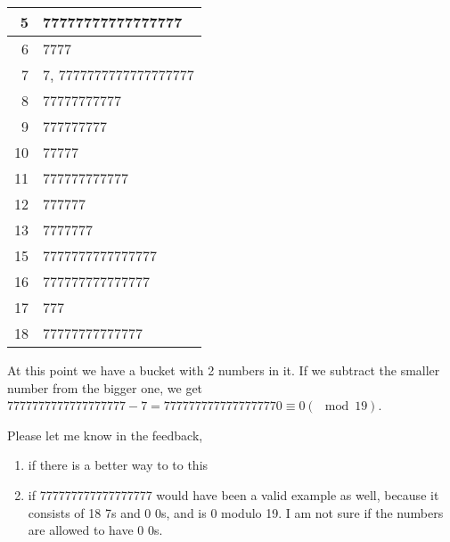 \documentclass[12pt]{article}
\begin{document}
\begin{enumerate}[a]
\begin{multicols}{2}
\begin{enumerate}[1]
\begin{tabular}{r|l}
			5 & 77777777777777777\\\hline
			6 & 7777\\\hline
			7 & 7, 7777777777777777777\\\hline
			8 & 77777777777\\\hline
			9 & 777777777\\\hline
			10 & 77777\\\hline
			11 & 777777777777\\\hline
			12 & 777777\\\hline
			13 & 7777777\\\hline
			15 & 7777777777777777\\\hline
			16 & 777777777777777\\\hline
			17 & 777\\\hline
			18 & 77777777777777
		\end{tabular}
	\end{enumerate}
	\end{multicols}

	At this point we have a bucket with 2 numbers in it. If we subtract the smaller number from the bigger one, we get $7777777777777777777 - 7 = 7777777777777777770 \equiv 0 (\mod 19)$.

	Please let me know in the feedback,
	\begin{enumerate}
		\item if there is a better way to to this
		\item if 777777777777777777 would have been a valid example as well, because it consists of 18 7s and 0 0s, and is 0 modulo 19. I am not sure if the numbers are allowed to have 0 0s.
	\end{enumerate}
\end{enumerate}
\end{document}
